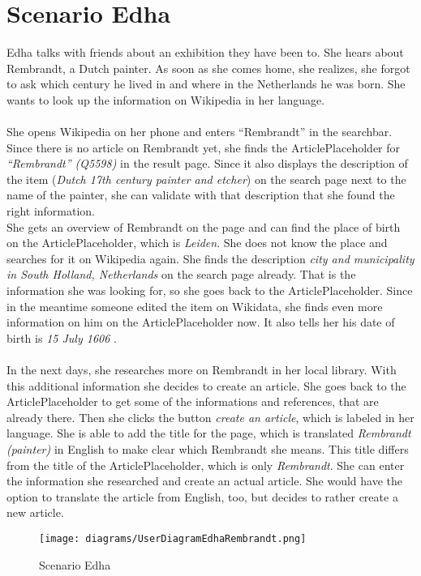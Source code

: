 \section{Scenario Edha} 
Edha talks with friends about an exhibition they have been to. She hears about Rembrandt, a Dutch painter. As soon as she comes home, she realizes, she forgot to ask which century he lived in and where in the Netherlands he was born. She wants to look up the information on Wikipedia in her language. \\
\\ 
She opens Wikipedia on her phone and enters ``Rembrandt'' in the searchbar. Since there is no article on Rembrandt yet, she finds the ArticlePlaceholder for \textit{``Rembrandt'' (Q5598)} \citep{wd:01} in the result page. Since it also displays the description of the item (\textit{Dutch 17th century painter and etcher}) on the search page next to the name of the painter, she can validate with that description that she found the right information. \\
She gets an overview of Rembrandt on the page and can find the place of birth on the ArticlePlaceholder, which is \textit{Leiden}. She does not know the place and searches for it on Wikipedia again. She finds the description \textit{city and municipality in South Holland, Netherlands} \citep{wd:02} on the search page already. That is the information she was looking for, so she goes back to the ArticlePlaceholder. Since in the meantime someone edited the item on Wikidata, she finds even more information on him on the ArticlePlaceholder now. It also tells her his date of birth is \textit{15 July 1606} \citep{wd:01}. \\
\\
In the next days, she researches more on Rembrandt in her local library. With this additional information she decides to create an article. She goes back to the ArticlePlaceholder to get some of the informations and references, that are already there. Then she clicks the button \textit{create an article}, which is labeled in her language. She is able to add the title for the page, which is translated \textit{Rembrandt (painter)} in English to make clear which Rembrandt she means. This title differs from the title of the ArticlePlaceholder, which is only \textit{Rembrandt}. She can enter the information she researched and create an actual article. She would have the option to translate the article from English, too, but decides to rather create a new article.
\begin{figure}[H]
	\centering
	\texttt{[image: diagrams/UserDiagramEdhaRembrandt.png]}
	\caption{Scenario Edha}
	\label{fig:ScenarioEdha}
\end{figure}


